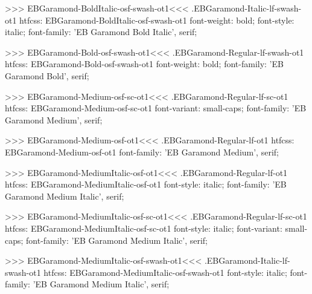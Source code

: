 {{{{{{{>>>
\<EBGaramond-BoldItalic-osf-swash-ot1\><<<
.EBGaramond-Italic-lf-swash-ot1
htfcss:  EBGaramond-BoldItalic-osf-swash-ot1  font-weight: bold; font-style: italic; font-family: 'EB Garamond Bold Italic', serif;

>>>
\<EBGaramond-Bold-osf-swash-ot1\><<<
.EBGaramond-Regular-lf-swash-ot1
htfcss:  EBGaramond-Bold-osf-swash-ot1  font-weight: bold; font-family: 'EB Garamond Bold', serif;

>>>
\<EBGaramond-Medium-osf-sc-ot1\><<<
.EBGaramond-Regular-lf-sc-ot1
htfcss:  EBGaramond-Medium-osf-sc-ot1  font-variant: small-caps; font-family: 'EB Garamond Medium', serif;

>>>
\<EBGaramond-Medium-osf-ot1\><<<
.EBGaramond-Regular-lf-ot1
htfcss:  EBGaramond-Medium-osf-ot1  font-family: 'EB Garamond Medium', serif;

>>>
\<EBGaramond-MediumItalic-osf-ot1\><<<
.EBGaramond-Regular-lf-ot1
htfcss:  EBGaramond-MediumItalic-osf-ot1  font-style: italic; font-family: 'EB Garamond Medium Italic', serif;

>>>
\<EBGaramond-MediumItalic-osf-sc-ot1\><<<
.EBGaramond-Regular-lf-sc-ot1
htfcss:  EBGaramond-MediumItalic-osf-sc-ot1  font-style: italic; font-variant: small-caps; font-family: 'EB Garamond Medium Italic', serif;

>>>
\<EBGaramond-MediumItalic-osf-swash-ot1\><<<
.EBGaramond-Italic-lf-swash-ot1
htfcss:  EBGaramond-MediumItalic-osf-swash-ot1  font-style: italic; font-family: 'EB Garamond Medium Italic', serif;

}}}}}}}
